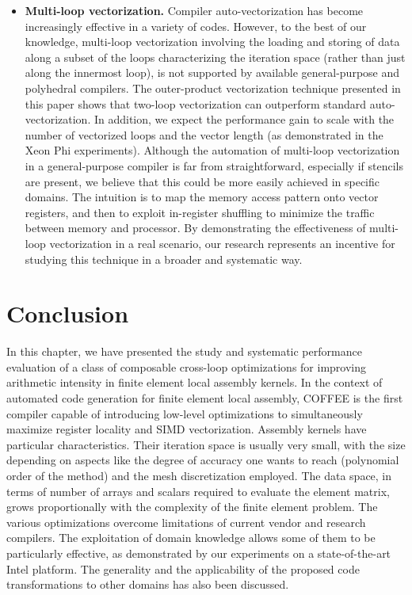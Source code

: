 \begin{itemize}
\item \textbf{Multi-loop vectorization.} Compiler auto-vectorization has become increasingly effective in a variety of codes. However, to the best of our knowledge, multi-loop vectorization involving the loading and storing of data along a subset of the loops characterizing the iteration space (rather than just along the innermost loop), is not supported by available general-purpose and polyhedral compilers. The outer-product vectorization technique presented in this paper shows that two-loop vectorization can outperform standard auto-vectorization. In addition, we expect the performance gain to scale with the number of vectorized loops and the vector length (as demonstrated in  the Xeon Phi experiments). Although the automation of multi-loop vectorization in a general-purpose compiler is far from straightforward, especially if stencils are present, we believe that this could be more easily achieved in specific domains. The intuition is to map the memory access pattern onto vector registers, and then to exploit in-register shuffling to minimize the traffic between memory and processor. By demonstrating the effectiveness of multi-loop vectorization in a real scenario, our research represents an incentive for studying this technique in a broader and systematic way.
\end{itemize}

\section{Conclusion}
\label{sec:coffee-conclusion}
In this chapter, we have presented the study and systematic performance evaluation of a class of composable cross-loop optimizations for improving arithmetic intensity in finite element local assembly kernels. In the context of automated code generation for finite element local assembly, COFFEE is the first compiler capable of introducing low-level optimizations to simultaneously maximize register locality and SIMD vectorization. Assembly kernels have particular characteristics. Their iteration space is usually very small, with the size depending on aspects like the degree of accuracy one wants to reach (polynomial order of the method) and the mesh discretization employed. The data space, in terms of number of arrays and scalars required to evaluate the element matrix, grows proportionally with the complexity of the finite element problem. The various optimizations overcome limitations of current vendor and research compilers. The exploitation of domain knowledge allows some of them to be particularly effective, as demonstrated by our experiments on a state-of-the-art Intel platform. The generality and the applicability of the proposed code transformations to other domains has also been discussed.
